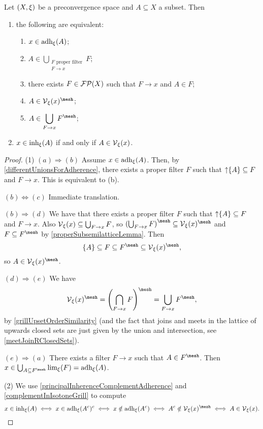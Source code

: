 \begin{proposition} \label{principalAdherenceInherence}
Let $\sSet{X,\xi}$ be a preconvergence space and $A\subseteq X$ a subset. Then
\begin{enumerate}
\item the following are equivalent:
\begin{enumerate}
\item $x\in \operatorname{adh}_\xi(A)$;
\item $\displaystyle A \in \bigcup_{\substack{\text{$F$ proper filter} \\F\to x}} F$;
\item there exists $F\in\operatorname{\mathcal{FP}}(X)$ such that $F\to x$ and $A\in F$;
\item $A\in \vicinities_\xi(x)^{\mesh}$;
\item $\displaystyle A \in \bigcup_{F\to x} F^{\mesh}$;
\end{enumerate}
\item $x\in \operatorname{inh}_\xi(A)$ \textup{if and only if} $A\in \operatorname{\mathcal{V}}_\xi(x)$.
\end{enumerate}
\end{proposition}
\begin{proof}
(1) $(a) \Rightarrow (b)$ Assume $x\in \operatorname{adh}_\xi(A)$. Then, by \ref{differentUnionsForAdherence}, there exists a proper filter $F$ such that $\operatorname{\uparrow}\{A\}\subseteq F$ and $F\to x$. This is equivalent to (b).

$(b) \Leftrightarrow (c)$ Immediate translation.

$(b) \Rightarrow (d)$ We have that there exists a proper filter $F$ such that $\operatorname{\uparrow}\{A\}\subseteq F$ and $F\to x$. Also $\operatorname{\mathcal{V}}_\xi(x)\subseteq \bigcup_{F\to x} F$, so $\left(\bigcup_{F\to x} F\right)^\mesh \subseteq \vicinities_\xi(x)^\mesh$ and $F\subseteq F^\mesh$ by \ref{properSubsemilatticeLemma}. Then
\[ \{A\} \subseteq F\subseteq F^\mesh\subseteq \vicinities_\xi(x)^\mesh, \]
so $A\in \vicinities_\xi(x)^\mesh$.

$(d) \Rightarrow (e)$ We have
\[ \vicinities_\xi(x)^\mesh = \left(\bigcap_{F\to x} F\right)^\mesh = \bigcup_{F\to x}F^\mesh, \]
by \ref{grillUpsetOrderSimilarity} (and the fact that joins and meets in the lattice of upwards closed sets are just given by the union and intersection, see \ref{meetJoinRClosedSets}).

$(e) \Rightarrow (a)$ There exists a filter $F\to x$ such that $A\in F^\mesh$. Then $x\in \bigcup_{A\subseteq F^\mesh}\lim_\xi(F) = \adh_\xi(A)$.

(2) We use \ref{principalInherenceComplementAdherence} and \ref{complementInIsotoneGrill} to compute
\[ x\in \inh_\xi(A) \iff x\in \adh_\xi(A^c)^c \iff x\notin \adh_\xi(A^c) \iff A^c\notin \vicinities_\xi(x)^\mesh \iff A\in \vicinities_\xi(x). \]
\end{proof}
